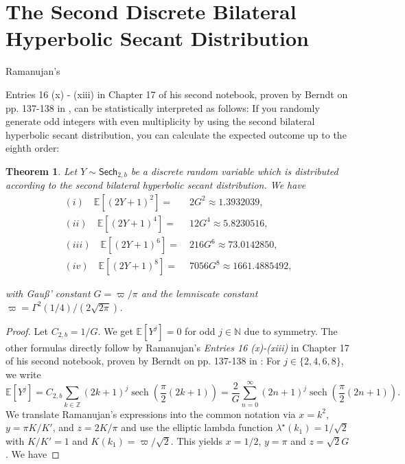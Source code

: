 \documentclass[12pt]{amsart}
\newtheorem{theorem}{Theorem}[section]
\theoremstyle{definition}
\theoremstyle{remark}
\numberwithin{equation}{section}
\newcommand{\1}{\mathbbm{1}}
\begin{document}
\section{The Second Discrete Bilateral Hyperbolic Secant Distribution}

Ramanujan's {Entries 16 (x) - (xiii) in Chapter 17 of his second notebook, proven by Berndt on pp. 137-138 in \cite{ramanujan_1991}, can be statistically interpreted as follows: If you randomly generate odd integers with even multiplicity by using the second bilateral hyperbolic secant distribution, you can calculate the expected outcome up to the eighth order:

\begin{theorem} 
Let $Y\sim\mathsf{Sech}_{2,b}$ be a discrete random variable which is distributed according to the second bilateral hyperbolic secant distribution. We have
\begin{align*}    
(i) \quad \mathbb{E}\left[(2Y+1)^2 \right] =&\ 2G^2 \approx 1.3932039,\\
(ii) \quad \mathbb{E}\left[(2Y+1)^4 \right] =&\ 12 G^4 \approx 5.8230516,\\
(iii) \quad \mathbb{E}\left[(2Y+1)^6 \right] =&\ 216 G^6 \approx 73.0142850,\\
(iv) \quad \mathbb{E}\left[(2Y+1)^8 \right] =&\ 7056 G^8 \approx 1661.4885492,
\end{align*}

with Gau\ss' constant $G = \varpi/\pi$ and the lemniscate constant $\varpi = \Gamma^2(1/4)/(2\sqrt{2\pi})$.
\end{theorem}

\begin{proof}
Let $C_{2,b} = 1/G$. We get $\mathbb{E}[Y^j] = 0$ for odd $j \in \mathbb{N}$ due to symmetry. The other formulas directly follow by Ramanujan's \textit{Entries 16 (x)-(xiii)} in Chapter 17 of his second notebook, proven by Berndt on pp. 137-138 in \cite{ramanujan_1991}: For $j\in \{2,4,6,8\}$, we write
$$
\mathbb{E}\left[Y^{j}\right] = C_{2,b} \sum_{k\in\mathbb{Z}} (2k+1)^{j} \operatorname{sech}\left(\frac{\pi}{2} (2k+1)\right) = \frac{2}{G} \sum_{n=0}^\infty (2n+1)^{j} \operatorname{sech}\left(\frac{\pi}{2} (2n+1)\right).
$$
We translate Ramanujan's expressions into the common notation via $x = k^2$, $y = \pi K/K'$, and $z=2 K/\pi$ and use the elliptic lambda function $\lambda^\star(k_1) = 1/\sqrt{2}$ with $K/K'=1$ and $K(k_1)=\varpi/\sqrt{2}$. This yields $x=1/2$, $y=\pi$ and $z=\sqrt{2}G$. We have


\end{proof}}
\end{document}
